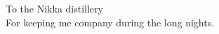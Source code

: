 \begin{dedication}
{\large{To the Nikka distillery}}\\[5mm]
For keeping me company during the long nights.
\end{dedication}

